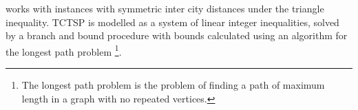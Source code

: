 \documentclass{mprop}
\theoremstyle{definition}
\begin{document}
\citet{Baker83} works with instances with symmetric inter city distances under the triangle inequality. TCTSP is modelled as a system of linear integer inequalities, solved by a branch and bound procedure with bounds calculated using an algorithm for the longest path problem \footnote{The longest path problem is the problem of finding a path of maximum length in a graph with no repeated vertices.}.





\end{document}

